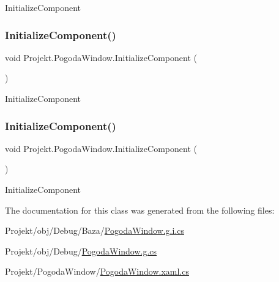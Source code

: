 Initialize\+Component 

\mbox{\label{class_projekt_1_1_pogoda_window_a6800b0c504dd7256b2bcfb3352b6206f}} 
\subsubsection{\texorpdfstring{InitializeComponent()}{InitializeComponent()}\hspace{0.1cm}{\footnotesize\ttfamily [3/4]}}
{\footnotesize\ttfamily void Projekt.\+Pogoda\+Window.\+Initialize\+Component (\begin{DoxyParamCaption}{ }\end{DoxyParamCaption})}



Initialize\+Component 

\mbox{\label{class_projekt_1_1_pogoda_window_a6800b0c504dd7256b2bcfb3352b6206f}} 
\subsubsection{\texorpdfstring{InitializeComponent()}{InitializeComponent()}\hspace{0.1cm}{\footnotesize\ttfamily [4/4]}}
{\footnotesize\ttfamily void Projekt.\+Pogoda\+Window.\+Initialize\+Component (\begin{DoxyParamCaption}{ }\end{DoxyParamCaption})}



Initialize\+Component 



The documentation for this class was generated from the following files\+:\begin{DoxyCompactItemize}
\item 
Projekt/obj/\+Debug/\+Baza/\mbox{\hyperlink{_baza_2_pogoda_window_8g_8i_8cs}{Pogoda\+Window.\+g.\+i.\+cs}}\item 
Projekt/obj/\+Debug/\mbox{\hyperlink{_pogoda_window_8g_8cs}{Pogoda\+Window.\+g.\+cs}}\item 
Projekt/\+Pogoda\+Window/\mbox{\hyperlink{_pogoda_window_8xaml_8cs}{Pogoda\+Window.\+xaml.\+cs}}\end{DoxyCompactItemize}

